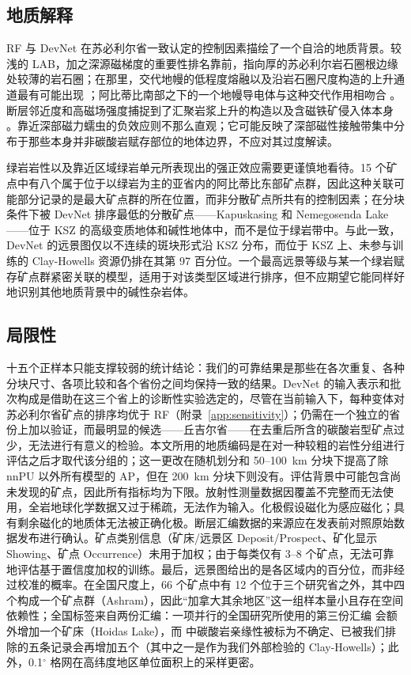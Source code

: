 \documentclass[pdflatex,sn-apa]{sn-jnl}
\begin{document}
\subsection{地质解释}\label{sec:disc-geology}

RF 与 DevNet 在苏必利尔省一致认定的控制因素描绘了一个自洽的地质背景。较浅的 LAB，加之深源磁梯度的重要性排名靠前，指向厚的苏必利尔岩石圈根边缘处较薄的岩石圈；在那里，交代地幔的低程度熔融以及沿岩石圈尺度构造的上升通道最有可能出现 \citep{Griffin2013,Groves2021,Hoggard2020}；阿比蒂比南部之下的一个地幔导电体与这种交代作用相吻合 \citep{Snyder2021}。断层邻近度和高磁场强度捕捉到了汇聚岩浆上升的构造以及含磁铁矿侵入体本身 \citep{Thomas2016}。靠近深部磁力蠕虫的负效应则不那么直观；它可能反映了深部磁性接触带集中分布于那些本身并非碳酸岩赋存部位的地体边界，不应对其过度解读。

绿岩岩性以及靠近区域绿岩单元所表现出的强正效应需要更谨慎地看待。15 个矿点中有八个属于位于以绿岩为主的亚省内的阿比蒂比东部矿点群，因此这种关联可能部分记录的是最大矿点群的所在位置，而非分散矿点所共有的控制因素；在分块条件下被 DevNet 排序最低的分散矿点——Kapuskasing 和 Nemegosenda Lake——位于 KSZ 的高级变质地体和碱性地体中，而不是位于绿岩带中。与此一致，DevNet 的远景图仅以不连续的斑块形式沿 KSZ 分布，而位于 KSZ 上、未参与训练的 Clay-Howells 资源仍排在其第 97 百分位。一个最高远景等级与某一个绿岩赋存矿点群紧密关联的模型，适用于对该类型区域进行排序，但不应期望它能同样好地识别其他地质背景中的碱性杂岩体。

\subsection{局限性}\label{sec:limitations}

十五个正样本只能支撑较弱的统计结论：我们的可靠结果是那些在各次重复、各种分块尺寸、各项比较和各个省份之间均保持一致的结果。DevNet 的输入表示和批次构成是借助在这三个省上的诊断性实验选定的，尽管在当前输入下，每种变体对苏必利尔省矿点的排序均优于 RF（附录~\ref{app:sensitivity}）；仍需在一个独立的省份上加以验证，而最明显的候选——丘吉尔省——在去重后所含的碳酸岩型矿点过少，无法进行有意义的检验。本文所用的地质编码是在对一种较粗的岩性分组进行评估之后才取代该分组的；这一更改在随机划分和 50--100~km 分块下提高了除 nnPU 以外所有模型的 AP，但在 200~km 分块下则没有。评估背景中可能包含尚未发现的矿点，因此所有指标均为下限。放射性测量数据因覆盖不完整而无法使用，全岩地球化学数据又过于稀疏，无法作为输入。化极假设磁化为感应磁化；具有剩余磁化的地质体无法被正确化极。断层汇编数据的来源应在发表前对照原始数据发布进行确认。矿点类别信息（矿床/远景区 Deposit/Prospect、矿化显示 Showing、矿点 Occurrence）未用于加权；由于每类仅有 3--8 个矿点，无法可靠地评估基于置信度加权的训练。最后，远景图给出的是各区域内的百分位，而非经过校准的概率。在全国尺度上，66 个矿点中有 12 个位于三个研究省之外，其中四个构成一个矿点群（Ashram），因此“加拿大其余地区”这一组样本量小且存在空间依赖性；全国标签来自两份汇编：一项并行的全国研究所使用的第三份汇编 \citep{Huston2024} 会额外增加一个矿床（Hoidas Lake），而 \citet{Orris2018} 中碳酸岩亲缘性被标为不确定、已被我们排除的五条记录会再增加五个（其中之一是作为我们外部检验的 Clay-Howells）；此外，0.1$^\circ$ 格网在高纬度地区单位面积上的采样更密。
\end{document}
